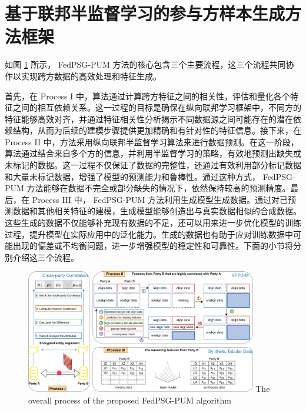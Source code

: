 \section{基于联邦半监督学习的参与方样本生成方法框架}
如图 \ref{fig: FedPSG-PUM} 所示， FedPSG-PUM  方法的核心包含三个主要流程，这三个流程共同协作以实现跨方数据的高效处理和特征生成。


首先，在 Process I 中，算法通过计算跨方特征之间的相关性，评估和量化各个特征之间的相互依赖关系。这一过程的目标是确保在纵向联邦学习框架中，不同方的特征能够高效对齐，并通过特征相关性分析揭示不同数据源之间可能存在的潜在依赖结构，从而为后续的建模步骤提供更加精确和有针对性的特征信息。接下来，在 Process II 中，方法采用纵向联邦半监督学习算法来进行数据预测。在这一阶段，算法通过结合来自多个方的信息，并利用半监督学习的策略，有效地预测出缺失或未标记的数据。这一过程不仅保证了数据的完整性，还通过有效利用部分标记数据和大量未标记数据，增强了模型的预测能力和鲁棒性。通过这种方式， FedPSG-PUM  方法能够在数据不完全或部分缺失的情况下，依然保持较高的预测精度。最后，在 Process III 中， FedPSG-PUM  方法利用生成模型生成数据。通过对已预测数据和其他相关特征的建模，生成模型能够创造出与真实数据相似的合成数据。这些生成的数据不仅能够补充现有数据的不足，还可以用来进一步优化模型的训练过程，提升模型在实际应用中的泛化能力。生成的数据也有助于应对训练数据中可能出现的偏差或不均衡问题，进一步增强模型的稳定性和可靠性。下面的小节将分别介绍这三个流程。

\vspace{-0.1cm}
\begin{figure}[h]  %
	\centering     %
	\includegraphics[width=0.9\textwidth]{chapters/imgs/FedPSG-PUM }  
	{\wuhao The overall process of the proposed  FedPSG-PUM  algorithm}
	\label{fig: FedPSG-PUM}  %
\end{figure}
\vspace{-0.35cm}

